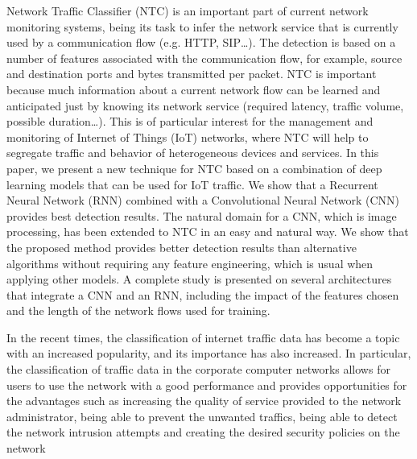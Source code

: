 \documentclass[10pt,journal,compsoc]{IEEEtran}
\begin{document}
 Network Traffic Classifier (NTC) is an important
part of current network monitoring systems, being its task to infer the network service that is currently used by a communication flow (e.g. HTTP, SIP…). The detection is based on a number of features associated with the communication flow, for example, source and destination ports and bytes transmitted per packet. NTC is important because much information about a current network flow can be learned and anticipated just by knowing its network service (required latency, traffic volume, possible duration…). This is of particular interest for the management and monitoring of Internet of Things (IoT) networks, where NTC will help to segregate traffic and behavior of heterogeneous devices and services. In this paper, we present a new technique for NTC based on a combination of deep learning models that can be used for IoT traffic. We show that a Recurrent Neural Network (RNN) combined with a Convolutional Neural Network (CNN) provides best detection results. The natural domain for a CNN, which is image processing, has been extended to NTC in an easy and natural way. We show that the proposed method provides better detection results than alternative algorithms without requiring any feature engineering, which is usual when applying other models. A complete study is presented on several architectures that integrate a CNN and an RNN, including the impact of the features chosen and the length of the network flows used for training.

In the recent times, the classification of internet traffic data has
become a topic with an increased popularity, and its importance
has also increased. In particular, the classification of traffic data
in the corporate computer networks allows for users to use the
network with a good performance and provides opportunities for
the advantages such as increasing the quality of service provided
to the network administrator, being able to prevent the unwanted
traffics, being able to detect the network intrusion attempts and
creating the desired security policies on the network
\end{document}
